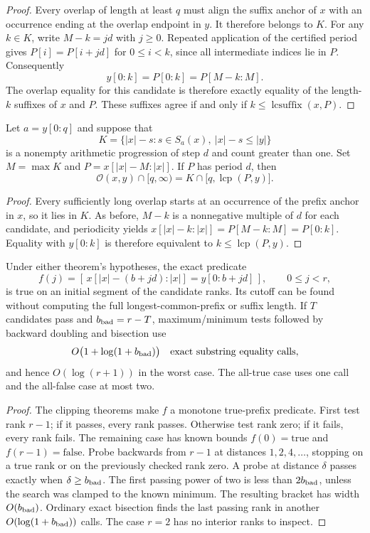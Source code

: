 \begin{proof}
Every overlap of length at least $q$ must align the suffix anchor of $x$
with an occurrence ending at the overlap endpoint in $y$.  It therefore
belongs to $K$.  For any $k\in K$, write $M-k=jd$ with $j\geq0$.
Repeated application of the certified period gives
$P[i]=P[i+jd]$ for $0\leq i<k$, since all intermediate indices lie in $P$.
Consequently
\[
 y[0:k]=P[0:k]=P[M-k:M].
\]
The overlap equality for this candidate is therefore exactly equality of
the length-$k$ suffixes of $x$ and $P$.  These suffixes agree if and only if
$k\leq\operatorname{lcsuffix}(x,P)$.
\end{proof}

\begin{theorem}
Let $a=y[0:q]$ and suppose that
\[
 K=\{|x|-s:s\in S_a(x),\ |x|-s\leq |y|\}
\]
is a nonempty arithmetic progression of step $d$ and count greater than
one.  Set $M=\max K$ and $P=x[|x|-M:|x|]$.  If $P$ has period $d$, then
\[
 \mathcal O(x,y)\cap[q,\infty)
   =K\cap\bigl[q,\operatorname{lcp}(P,y)\bigr].
\]
\end{theorem}

\begin{proof}
Every sufficiently long overlap starts at an occurrence of the prefix
anchor in $x$, so it lies in $K$.  As before, $M-k$ is a nonnegative
multiple of $d$ for each candidate, and periodicity yields
$x[|x|-k:|x|]=P[M-k:M]=P[0:k]$.  Equality with $y[0:k]$ is therefore
equivalent to $k\leq\operatorname{lcp}(P,y)$.
\end{proof}

\begin{corollary}
Under either theorem's hypotheses, the exact predicate
\[
 f(j)=[\,x[|x|-(b+jd):|x|]=y[0:b+jd]\,],\qquad 0\leq j<r,
\]
is true on an initial segment of the candidate ranks.  Its cutoff can be
found without computing the full longest-common-prefix or suffix length.
If $T$ candidates pass and $b_{\rm bad}=r-T$, maximum/minimum tests followed
by backward doubling and bisection use
\[
 O\bigl(1+\log(1+b_{\rm bad})\bigr)
 \quad\hbox{exact substring equality calls},
\]
and hence $O(\log(r+1))$ in the worst case.  The all-true case uses one
call and the all-false case at most two.
\end{corollary}

\begin{proof}
The clipping theorems make $f$ a monotone true-prefix predicate.
First test rank $r-1$; if it passes, every rank passes.  Otherwise test rank
zero; if it fails, every rank fails.  The remaining case has known bounds
$f(0)=\mathrm{true}$ and $f(r-1)=\mathrm{false}$.
Probe backwards from $r-1$ at distances $1,2,4,\ldots$, stopping on a true
rank or on the previously checked rank zero.  A probe at distance $\delta$
passes exactly when $\delta\geq b_{\rm bad}$.  The first passing power of
two is less than $2b_{\rm bad}$, unless the search was clamped to the known
minimum.  The resulting bracket has width $O(b_{\rm bad})$.  Ordinary exact
bisection finds the last passing rank in another $O(\log(1+b_{\rm bad}))$
calls.  The case $r=2$ has no interior ranks to inspect.
\end{proof}

